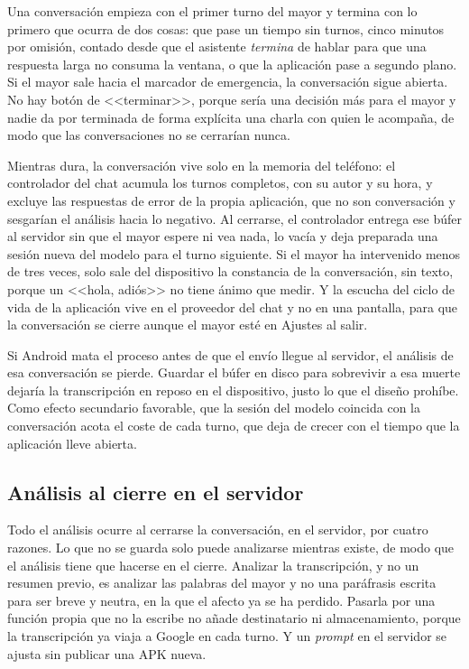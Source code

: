 Una conversación empieza con el primer turno del mayor y termina con lo primero que ocurra de dos cosas: que pase un tiempo sin turnos, cinco minutos por omisión, contado desde que el asistente \emph{termina} de hablar para que una respuesta larga no consuma la ventana, o que la aplicación pase a segundo plano. Si el mayor sale hacia el marcador de emergencia, la conversación sigue abierta. No hay botón de <<terminar>>, porque sería una decisión más para el mayor y nadie da por terminada de forma explícita una charla con quien le acompaña, de modo que las conversaciones no se cerrarían nunca.

Mientras dura, la conversación vive solo en la memoria del teléfono: el controlador del chat acumula los turnos completos, con su autor y su hora, y excluye las respuestas de error de la propia aplicación, que no son conversación y sesgarían el análisis hacia lo negativo. Al cerrarse, el controlador entrega ese búfer al servidor sin que el mayor espere ni vea nada, lo vacía y deja preparada una sesión nueva del modelo para el turno siguiente. Si el mayor ha intervenido menos de tres veces, solo sale del dispositivo la constancia de la conversación, sin texto, porque un <<hola, adiós>> no tiene ánimo que medir. Y la escucha del ciclo de vida de la aplicación vive en el proveedor del chat y no en una pantalla, para que la conversación se cierre aunque el mayor esté en Ajustes al salir.

Si Android mata el proceso antes de que el envío llegue al servidor, el análisis de esa conversación se pierde. Guardar el búfer en disco para sobrevivir a esa muerte dejaría la transcripción en reposo en el dispositivo, justo lo que el diseño prohíbe. Como efecto secundario favorable, que la sesión del modelo coincida con la conversación acota el coste de cada turno, que deja de crecer con el tiempo que la aplicación lleve abierta.

\subsection{Análisis al cierre en el servidor}

Todo el análisis ocurre al cerrarse la conversación, en el servidor, por cuatro razones. Lo que no se guarda solo puede analizarse mientras existe, de modo que el análisis tiene que hacerse en el cierre. Analizar la transcripción, y no un resumen previo, es analizar las palabras del mayor y no una paráfrasis escrita para ser breve y neutra, en la que el afecto ya se ha perdido. Pasarla por una función propia que no la escribe no añade destinatario ni almacenamiento, porque la transcripción ya viaja a Google en cada turno. Y un \emph{prompt} en el servidor se ajusta sin publicar una APK nueva.

